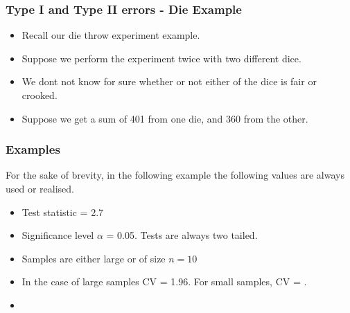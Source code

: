 ﻿\documentclass[a4]{beamer}
\begin{document}
\begin{frame}
\frametitle{Type I and Type II errors - Die Example}
\begin{itemize}
\item Recall our die throw experiment example. 
\item Suppose we perform the experiment twice with two different dice.
\item We dont not know for sure whether or not either of the dice is fair or crooked.
\item Suppose we get a sum of 401 from one die, and 360 from the other.
\end{itemize}
\end{frame}





\begin{frame}
\frametitle{Examples}
\large
For the sake of brevity, in the following example the following values are always used or realised.

\begin{itemize}
\item Test statistic  = 2.7
\item Significance level $\alpha$ = 0.05. Tests are always two tailed.
\item Samples are either large or of size $n = 10$
\item In the case of large samples CV = 1.96. For small samples, CV = .
\item
\end{itemize}
\end{frame}

\end{document}
